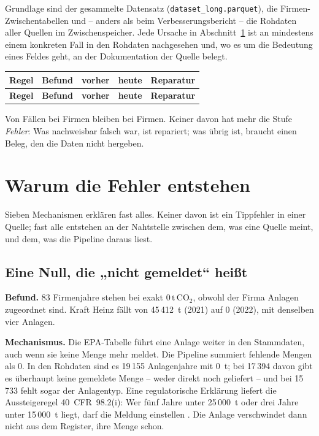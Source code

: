 \documentclass[11pt,a4paper]{article}
\newcommand{\tco}{\ensuremath{\mathrm{t\,CO}_{2}}}
\begin{document}
Grundlage sind der gesammelte Datensatz (\texttt{dataset\_long.parquet}), die Firmen-Zwischentabellen und -- anders als beim Verbesserungsbericht -- die Rohdaten aller Quellen im Zwischenspeicher. Jede Ursache in Abschnitt~\ref{sec:ursachen} ist an mindestens einem konkreten Fall in den Rohdaten nachgesehen und, wo es um die Bedeutung eines Feldes geht, an der Dokumentation der Quelle belegt.

\begin{center}\footnotesize
\begin{longtable}{l P{5.0cm} r r P{4.8cm}}
\toprule
\textbf{Regel} & \textbf{Befund} & \textbf{vorher} & \textbf{heute} & \textbf{Reparatur} \\
\midrule
\endfirsthead
\toprule
\textbf{Regel} & \textbf{Befund} & \textbf{vorher} & \textbf{heute} & \textbf{Reparatur} \\
\midrule
\endhead

\end{longtable}
\end{center}

Von \vorFlags{} Fällen bei \vorFirmen{} Firmen bleiben \statFlags{} bei \statFirmenBetr{} Firmen. Keiner davon hat mehr die Stufe \emph{Fehler}: Was nachweisbar falsch war, ist repariert; was übrig ist, braucht einen Beleg, den die Daten nicht hergeben.

\section{Warum die Fehler entstehen}
\label{sec:ursachen}

Sieben Mechanismen erklären fast alles. Keiner davon ist ein Tippfehler in einer Quelle; fast alle entstehen an der Nahtstelle zwischen dem, was eine Quelle meint, und dem, was die Pipeline daraus liest.

\subsection{Eine Null, die „nicht gemeldet“ heißt}

\textbf{Befund.} 83 Firmenjahre stehen bei exakt 0\,\tco{}, obwohl der Firma Anlagen zugeordnet sind. Kraft Heinz fällt von 45\,412~t (2021) auf 0 (2022), mit denselben vier Anlagen.

\textbf{Mechanismus.} Die EPA-Tabelle führt eine Anlage weiter in den Stammdaten, auch wenn sie keine Menge mehr meldet. Die Pipeline summiert fehlende Mengen als 0. In den Rohdaten sind es 19\,155 Anlagenjahre mit 0~t; bei 17\,394 davon gibt es überhaupt keine gemeldete Menge -- weder direkt noch geliefert -- und bei 15\,733 fehlt sogar der Anlagentyp. Eine regulatorische Erklärung liefert die Aussteigeregel 40~CFR~98.2(i): Wer fünf Jahre unter 25\,000~t oder drei Jahre unter 15\,000~t liegt, darf die Meldung einstellen \cite{ecfr982}. Die Anlage verschwindet dann nicht aus dem Register, ihre Menge schon.
\end{document}
